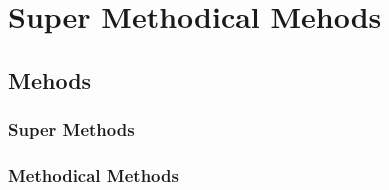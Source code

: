 

\section{Super Methodical Mehods}

\subsection{Mehods}

\subsubsection{Super Methods}

\subsubsection{Methodical Methods}


